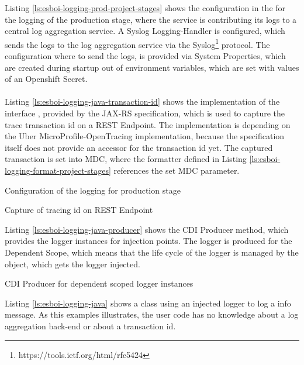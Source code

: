 Listing \vref{ls:esboi-logging-prod-project-stages} shows the configuration in the  for the logging of the production stage, where the service is contributing its logs to a central log aggregation service. A Syslog Logging-Handler is configured, which sends the logs to the log aggregation service via the Syslog\footnote{https://tools.ietf.org/html/rfc5424} protocol. The configuration where to send the logs, is provided via System Properties, which are created during startup out of environment variables, which are set with values of an Openshift Secret.
\\ \\
Listing \vref{ls:esboi-logging-java-transaction-id} shows the implementation of the interface , provided by the JAX-RS specification, which is used to capture the trace transaction id on a REST Endpoint. The implementation is depending on the Uber MicroProfile-OpenTracing implementation, because the specification itself does not provide an accessor for the transaction id yet. The captured transaction is set into MDC, where the formatter defined in Listing \vref{ls:esboi-logging-format-project-stages} references the set MDC parameter.
\newpage

\begin{listing}[h]
	\caption{Configuration of the logging for production stage}
	\label{ls:esboi-logging-prod-project-stages}
\end{listing}

\begin{listing}[h]
	\caption{Capture of tracing id on REST Endpoint}
	\label{ls:esboi-logging-java-transaction-id}
\end{listing} 

Listing \vref{ls:esboi-logging-java-producer} shows the CDI Producer method, which provides the logger instances for injection points. The logger is produced for the Dependent Scope, which means that the life cycle of the logger is managed by the object, which gets the logger injected.
\newpage

\begin{listing}[h]
	\caption{CDI Producer for dependent scoped logger instances}
	\label{ls:esboi-logging-java-producer}
\end{listing} 

Listing \vref{ls:esboi-logging-java} shows a class using an injected logger to log a info message. As this examples illustrates, the user code has no knowledge about a log aggregation back-end or about a transaction id.

